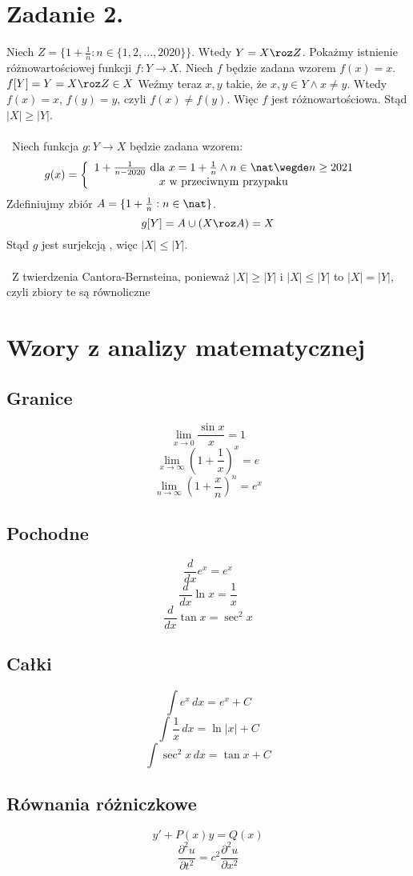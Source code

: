 \documentclass{article}
\begin{document}
\section*{Zadanie 2.}
Niech $Z = \{1+ \frac{1}{n} : n \in \{1,2, ... ,2020\}\}$. Wtedy $Y = X\roz Z$.
Pokażmy istnienie różnowartościowej funkcji $f: Y \rightarrow X$. Niech $f$ będzie zadana wzorem $f(x) = x$. $f[Y] = Y = X \roz Z \in X$ Weźmy teraz $x,y$ takie, że $x,y \in Y \wedge x\neq y$.
Wtedy $f(x) = x$, $f(y) = y$, czyli $f(x) \neq f(y)$. Więc $f$ jest różnowartościowa. Stąd $|X|\geq|Y|$.
\\\
\\\
Niech funkcja $g:Y\rightarrow X$ będzie zadana wzorem:
\[g(x) = \left\{\begin{array}{cc}
   1 + \frac{1}{n-2020}  \ \mbox{dla} \ x = 1 + \frac{1}{n} \wedge n\in \nat \wegde n\geq 2021 &  \\
    x  \ \mbox{w przeciwnym przypaku} & 
\end{array}\right.\]
Zdefiniujmy zbiór $A = \{1 + \frac{1}{n} : n\in \nat\}$.
\[g[Y] = A \cup (X \roz A) = X\]
Stąd $g$ jest surjekcją , więc $|X|\leq|Y|$.
\\\
\\\
Z twierdzenia Cantora-Bernsteina, ponieważ $|X|\geq|Y|$ i $|X|\leq|Y|$ to $|X|=|Y|$, czyli zbiory te są równoliczne


\section*{Wzory z analizy matematycznej}

\subsection*{Granice}

\[
    \lim_{x \to 0} \frac{\sin x}{x} = 1
\]
\[
    \lim_{x \to \infty} \left(1 + \frac{1}{x}\right)^x = e
\]
\[
    \lim_{n \to \infty} \left(1 + \frac{x}{n}\right)^n = e^x
\]

\subsection*{Pochodne}

\[
    \frac{d}{dx} e^x = e^x
\]
\[
    \frac{d}{dx} \ln x = \frac{1}{x}
\]
\[
    \frac{d}{dx} \tan x = \sec^2 x
\]

\subsection*{Całki}

\[
    \int e^x \,dx = e^x + C
\]
\[
    \int \frac{1}{x} \,dx = \ln |x| + C
\]
\[
    \int \sec^2 x \,dx = \tan x + C
\]

\subsection*{Równania różniczkowe}

\[
    y' + P(x)y = Q(x)
\]
\[
    \frac{\partial^2 u}{\partial t^2} = c^2 \frac{\partial^2 u}{\partial x^2}
\]
\end{document}
